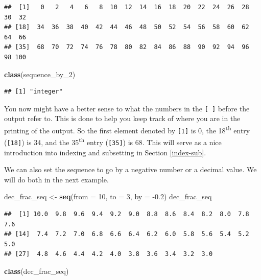 \documentclass[]{tufte-book}
\newenvironment{Shaded}{\begin{snugshade}}{\end{snugshade}}
\newcommand{\KeywordTok}[1]{\textcolor[rgb]{0.13,0.29,0.53}{\textbf{{#1}}}}
\newcommand{\DataTypeTok}[1]{\textcolor[rgb]{0.13,0.29,0.53}{{#1}}}
\newcommand{\DecValTok}[1]{\textcolor[rgb]{0.00,0.00,0.81}{{#1}}}
\newcommand{\FloatTok}[1]{\textcolor[rgb]{0.00,0.00,0.81}{{#1}}}
\newcommand{\StringTok}[1]{\textcolor[rgb]{0.31,0.60,0.02}{{#1}}}
\newcommand{\NormalTok}[1]{{#1}}
\begin{document}
\begin{verbatim}
##  [1]   0   2   4   6   8  10  12  14  16  18  20  22  24  26  28  30  32
## [18]  34  36  38  40  42  44  46  48  50  52  54  56  58  60  62  64  66
## [35]  68  70  72  74  76  78  80  82  84  86  88  90  92  94  96  98 100
\end{verbatim}

\begin{Shaded}
\begin{Highlighting}[]
\KeywordTok{class}\NormalTok{(sequence_by_2)}
\end{Highlighting}
\end{Shaded}

\begin{verbatim}
## [1] "integer"
\end{verbatim}

You now might have a better sense to what the numbers in the
\texttt{{[}\ {]}} before the output refer to. This is done to help you
keep track of where you are in the printing of the output. So the first
element denoted by \texttt{{[}1{]}} is 0, the 18\textsuperscript{th}
entry (\texttt{{[}18{]}}) is 34, and the 35\textsuperscript{th} entry
(\texttt{{[}35{]}}) is 68. This will serve as a nice introduction into
indexing and subsetting in Section \ref{index-sub}.

We can also set the sequence to go by a negative number or a decimal
value. We will do both in the next example.

\begin{Shaded}
\begin{Highlighting}[]
\NormalTok{dec_frac_seq <-}\StringTok{ }\KeywordTok{seq}\NormalTok{(}\DataTypeTok{from =} \DecValTok{10}\NormalTok{, }\DataTypeTok{to =} \DecValTok{3}\NormalTok{, }\DataTypeTok{by =} \NormalTok{-}\FloatTok{0.2}\NormalTok{)}
\NormalTok{dec_frac_seq}
\end{Highlighting}
\end{Shaded}

\begin{verbatim}
##  [1] 10.0  9.8  9.6  9.4  9.2  9.0  8.8  8.6  8.4  8.2  8.0  7.8  7.6
## [14]  7.4  7.2  7.0  6.8  6.6  6.4  6.2  6.0  5.8  5.6  5.4  5.2  5.0
## [27]  4.8  4.6  4.4  4.2  4.0  3.8  3.6  3.4  3.2  3.0
\end{verbatim}

\begin{Shaded}
\begin{Highlighting}[]
\KeywordTok{class}\NormalTok{(dec_frac_seq)}
\end{Highlighting}
\end{Shaded}
\end{document}
